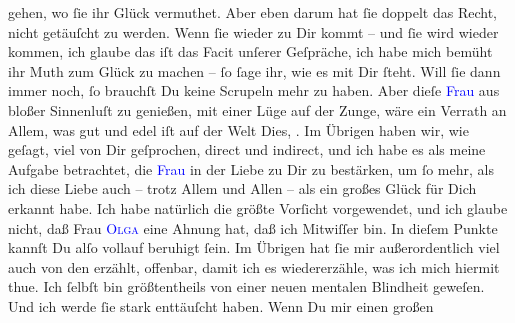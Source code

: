                gehen, wo ſie ihr Glück vermuthet. Aber eben darum hat ſie doppelt das Recht, nicht
               getäuſcht zu werden. Wenn ſie wieder zu Dir kommt – und ſie wird wieder kommen, ich
               glaube das iſt das Facit unſerer Geſpräche, ich habe mich bemüht ihr Muth zum Glück
               zu machen – ſo ſage ihr, wie es mit Dir ſteht. Will ſie dann immer noch, ſo brauchſt
               Du keine Scrupeln {\pb}mehr zu haben.
               Aber dieſe \textcolor{blue}{Frau}{} aus bloßer
               Sinnenluſt zu genießen, mit einer Lüge auf der Zunge, wäre ein Verrath an Allem, was
               gut und edel iſt auf der Welt{\dotsfour}\pend
           \pstart
           Dies, \label{K_L02648-3v}\label{K_L02648-3h}. Im Übrigen haben wir, wie geſagt, viel von Dir geſprochen, direct
               und indirect, und ich habe es als meine Aufgabe betrachtet, die \textcolor{blue}{Frau}{} in der Liebe zu Dir zu bestärken, um ſo
               mehr, als ich diese Liebe auch – trotz Allem und Allen – als ein großes Glück für
               Dich erkannt habe. Ich habe natürlich die größte Vorſicht vorgewendet, und ich glaube
               nicht, daß Frau \textsc{\textcolor{blue}{Olga}{}\ledrightnote{\textcolor{blue}{Olga Waissnix}}} eine Ahnung hat, daß ich Mit{\pb}wiſſer bin. In dieſem Punkte kannſt Du alſo vollauf beruhigt ſein. Im Übrigen hat
               ſie mir außerordentlich viel auch von den \label{K_L02648-5v}\label{K_L02648-5h} erzählt, offenbar, damit ich es wiedererzähle, was ich mich
               hiermit thue. Ich ſelbſt bin größtentheils von einer neuen mentalen Blindheit
               geweſen. Und ich werde ſie stark enttäuſcht haben. Wenn Du mir einen großen
